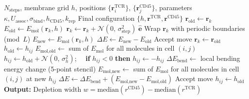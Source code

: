 \documentclass[11pt,a4paper]{article}
\begin{document}
\begin{algorithm}[ht]
\caption{Metropolis Monte Carlo for kinetic segregation}
\label{alg:mc}
\begin{algorithmic}[1]
\Require $N_\text{steps}$, membrane grid $h$, positions
  $\{\mathbf{r}^\text{TCR}_i\}$, $\{\mathbf{r}^\text{CD45}_j\}$,
  parameters $\kappa, U_\text{assoc}, \sigma_\text{bind},
  h_\text{CD45}, k_\text{rep}$
\Ensure Final configuration $\{h, \mathbf{r}^\text{TCR},
  \mathbf{r}^\text{CD45}\}$
\Statex
{}
  \Statex {}
    \State $\mathbf{r}_\text{old} \gets \mathbf{r}_k$
    \State $E_\text{old} \gets E_\text{mol}(\mathbf{r}_k, h)$
    \State $\mathbf{r}_k \gets \mathbf{r}_k
      + \mathcal{N}(0,\,\sigma_\text{step}^2)\;\hat{\mathbf{e}}$
    \State Wrap $\mathbf{r}_k$ with periodic boundaries (mod~$L$)
    \State $E_\text{new} \gets E_\text{mol}(\mathbf{r}_k, h)$
    \State $\Delta E \gets E_\text{new} - E_\text{old}$
      \State Accept move
    \Else
      \State $\mathbf{r}_k \gets \mathbf{r}_\text{old}$
    \EndIf
  \EndFor
  \Statex
  \Statex {}
    \State $h_\text{old} \gets h_{ij}$
    \State $E_\text{mol,old} \gets$ sum of $E_\text{mol}$ for all
      molecules in cell $(i,j)$
    \State $h_{ij} \gets h_\text{old}
      + \mathcal{N}(0,\,\sigma_h^2)$;~~
      \textbf{if} $h_{ij}<0$ \textbf{then} $h_{ij}\gets -h_{ij}$
    \State $\Delta E_\text{bend} \gets$
      local bending energy change (5-point stencil)
    \State $E_\text{mol,new} \gets$ sum of $E_\text{mol}$ for all
      molecules in cell $(i,j)$ at new $h_{ij}$
    \State $\Delta E \gets \Delta E_\text{bend}
      + (E_\text{mol,new} - E_\text{mol,old})$
      \State Accept move
    \Else
      \State $h_{ij} \gets h_\text{old}$ 
    \EndIf
  \EndFor
\EndFor
\Statex
\State \textbf{Output:} Depletion width
  $w = \text{median}(r^\text{CD45}) - \text{median}(r^\text{TCR})$
\end{algorithmic}
\end{algorithm}
\end{document}
